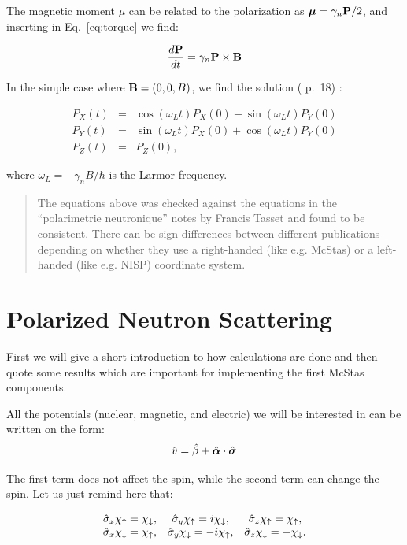 The magnetic moment $\mu$ can be related to the polarization as $\mbox{\boldmath $\mu$}
= \gamma_n \mathbf{P}/2$, and inserting in Eq.~\ref{eq:torque} we find:

\begin{equation}
  \label{eq:pol_magnetic}
  \frac{d\mathbf{P}}{dt} = \gamma_n \mathbf{P} \times \mathbf{B}
\end{equation}

In the simple case where $\mathbf{B} = (0, 0, B)$, we find the solution
(\cite{gavin} p.~18) :

\begin{eqnarray}
  \nonumber
  P_X(t) & = & \cos(\omega_L t) P_X(0) - \sin(\omega_L t) P_Y(0) \\
  \label{eq:precession}
  P_Y(t) & = & \sin(\omega_L t) P_X(0) + \cos(\omega_L t) P_Y(0) \\
  \nonumber
  P_Z(t) & = & P_Z(0),
\end{eqnarray}

where $\omega_L = -\gamma_n B/\hbar$ is the Larmor frequency.\\

\begin{quote}
  The equations above was checked against the equations in the ``polarimetrie
  neutronique'' notes by Francis Tasset and found to be consistent. There can
  be sign differences between different publications depending on whether they
  use a right-handed (like e.g. McStas) or a left-handed (like e.g. NISP)
  coordinate system.
\end{quote}

\section{Polarized Neutron Scattering}
\label{sec:scat}

First we will give a short introduction to how calculations are done
and then quote some results which are important for implementing the
first McStas components.

All the potentials (nuclear, magnetic, and electric) we will be interested in
can be written on the form:
\begin{equation}
  \label{eq:general_pot}
  \hat{v} = \hat{\beta} + \hat{\mbox{\boldmath $\alpha$}} \cdot \hat{\mbox{\boldmath $\sigma$}}
\end{equation}

The first term does not affect the spin, while the second term can
change the spin. Let us just remind here that:

\begin{equation}
  \label{eq:pauli_rules}
  \begin{matrix}
    \hat{\sigma}_x \chi_\uparrow = \chi_\downarrow, &
    \hat{\sigma}_y \chi_\uparrow = i\chi_\downarrow, &
    \hat{\sigma}_z \chi_\uparrow = \chi_\uparrow, \\
    \hat{\sigma}_x \chi_\downarrow = \chi_\uparrow, &
    \hat{\sigma}_y \chi_\downarrow = -i\chi_\uparrow, &
    \hat{\sigma}_z \chi_\downarrow = -\chi_\downarrow.
  \end{matrix} 
\end{equation}

